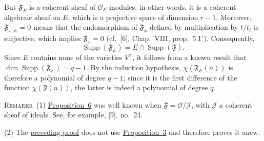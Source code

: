 But $\mathfrak F_E$ is a coherent sheaf of $\mathcal O_E$-modules;
in other words, it is a coherent algebraic sheaf on $E$, which is a
projective space of dimension $r-1$. Moreover,
$\mathfrak F_{x,E}=0$ means that the endomorphism of $\mathfrak F_x$
defined by multiplication by $t/t_i$ is surjective, which implies
$\mathfrak F_x=0$ (cf.~[6], Chap.~VIII, prop.~5.1$'$). Consequently,
\label{fac:III:6:no:81:formula:support-intersection}
\[
\operatorname{Supp}(\mathfrak F_E)
=E\cap\operatorname{Supp}(\mathfrak F).
\]
Since $E$ contains none of the varieties $V^\alpha$, it follows from
a known result that $\dim\operatorname{Supp}(\mathfrak F_E)=q-1$. By
the induction hypothesis, $\chi(\mathfrak F_E(n))$ is therefore a
polynomial of degree $q-1$; since it is the first difference of the
function $\chi(\mathfrak F(n))$, the latter is indeed a polynomial of
degree $q$.

\textsc{Remarks}. \label{fac:III:6:no:81:remark:1}
(1) \hyperref[fac:III:6:no:81:prop:6]{Proposition~6} was well known when
$\mathfrak F=\mathcal O/\mathcal J$, with $\mathcal J$ a coherent
sheaf of ideals. See, for example, [9], no.~24.

\label{fac:III:6:no:81:remark:2}
(2) The \hyperref[fac:III:6:no:81:prop:6:proof]{preceding proof} does not use
\hyperref[fac:III:6:no:80:prop:3]{Proposition~3} and therefore
proves it anew.
